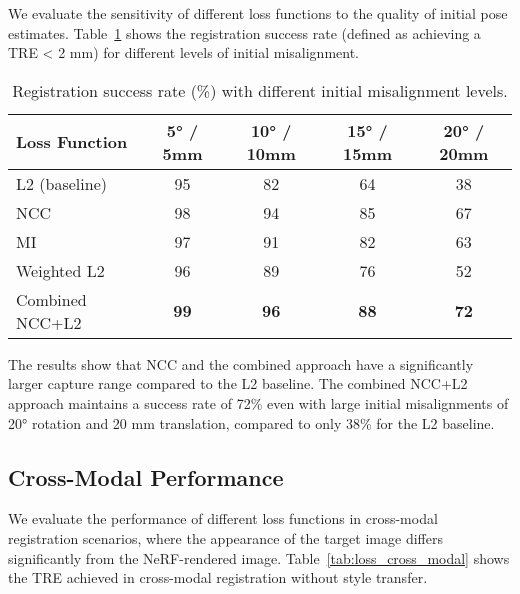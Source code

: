 We evaluate the sensitivity of different loss functions to the quality of initial pose estimates. Table~\ref{tab:loss_initialization} shows the registration success rate (defined as achieving a TRE < 2 mm) for different levels of initial misalignment.

\begin{table}[htpb]
  \caption[Registration success rate with different initial misalignment levels]{Registration success rate (\%) with different initial misalignment levels.}\label{tab:loss_initialization}
  \centering
  \begin{tabular}{l c c c c}
    \toprule
      Loss Function & 5° / 5mm & 10° / 10mm & 15° / 15mm & 20° / 20mm \\
    \midrule
      L2 (baseline) & 95 & 82 & 64 & 38 \\
      NCC & 98 & 94 & 85 & 67 \\
      MI & 97 & 91 & 82 & 63 \\
      Weighted L2 & 96 & 89 & 76 & 52 \\
      Combined NCC+L2 & \textbf{99} & \textbf{96} & \textbf{88} & \textbf{72} \\
    \bottomrule
  \end{tabular}
\end{table}

The results show that NCC and the combined approach have a significantly larger capture range compared to the L2 baseline. The combined NCC+L2 approach maintains a success rate of 72\% even with large initial misalignments of 20° rotation and 20 mm translation, compared to only 38\% for the L2 baseline.

\subsection{Cross-Modal Performance}

We evaluate the performance of different loss functions in cross-modal registration scenarios, where the appearance of the target image differs significantly from the NeRF-rendered image. Table~\ref{tab:loss_cross_modal} shows the TRE achieved in cross-modal registration without style transfer.

